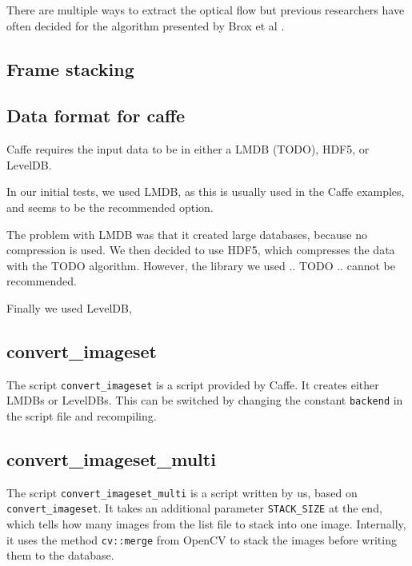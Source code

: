 There are multiple ways to extract the optical flow but previous researchers  have often decided for the algorithm presented by Brox et al \cite{brox2004high}.


\subsection{Frame stacking}


\subsection{Data format for caffe}
Caffe requires the input data to be in either a LMDB (TODO), HDF5, or LevelDB.

In our initial tests, we used LMDB, as this is usually used in the Caffe examples, and seems to be the recommended option.

The problem with LMDB was that it created large databases, because no compression is used.
We then decided to use HDF5, which compresses the data with the TODO algorithm.
However, the library we used .. TODO .. cannot be recommended.

Finally we used LevelDB,




\subsection{convert\_imageset}
The script \texttt{convert\_imageset} is a script provided by Caffe.
It creates either LMDBs or LevelDBs.
This can be switched by changing the constant \texttt{backend} in the script file and recompiling.

\subsection{convert\_imageset\_multi}
The script \texttt{convert\_imageset\_multi} is a script written by us, based on \texttt{convert\_imageset}.
It takes an additional parameter \texttt{STACK\_SIZE} at the end, which tells how many images from the list file to stack into one image.
Internally, it uses the method \texttt{cv::merge} from OpenCV to stack the images before writing them to the database.
